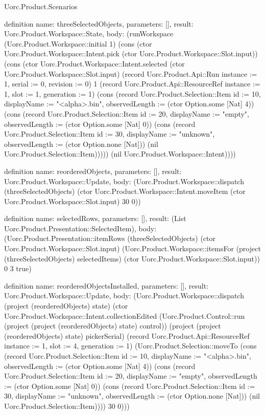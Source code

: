 \begin{lexlean}{Uorc.Product.Scenarios}
\begin{semanticmodule}
definition{
  name: threeSelectedObjects,
  parameters: [],
  result: Uorc.Product.Workspace::State,
  body: (runWorkspace (Uorc.Product.Workspace::initial 1) (cons (ctor Uorc.Product.Workspace::Intent.pick (ctor Uorc.Product.Workspace::Slot.input)) (cons (ctor Uorc.Product.Workspace::Intent.selected (ctor Uorc.Product.Workspace::Slot.input) (record Uorc.Product.Api::Run {instance := 1, serial := 0, revision := 0}) 1 (record Uorc.Product.Api::ResourceRef {instance := 1, slot := 1, generation := 1}) (cons (record Uorc.Product.Selection::Item {id := 10, displayName := "<alpha>.bin", observedLength := (ctor Option.some [Nat] 4)}) (cons (record Uorc.Product.Selection::Item {id := 20, displayName := "empty", observedLength := (ctor Option.some [Nat] 0)}) (cons (record Uorc.Product.Selection::Item {id := 30, displayName := "unknown", observedLength := (ctor Option.none [Nat])}) (nil Uorc.Product.Selection::Item))))) (nil Uorc.Product.Workspace::Intent))))
}

definition{
  name: reorderedObjects,
  parameters: [],
  result: Uorc.Product.Workspace::Update,
  body: (Uorc.Product.Workspace::dispatch (threeSelectedObjects) (ctor Uorc.Product.Workspace::Intent.moveItem (ctor Uorc.Product.Workspace::Slot.input) 30 0))
}

definition{
  name: selectedRows,
  parameters: [],
  result: (List Uorc.Product.Presentation::SelectedItem),
  body: (Uorc.Product.Presentation::itemRows (threeSelectedObjects) (ctor Uorc.Product.Workspace::Slot.input) (Uorc.Product.Workspace::itemsFor (project (threeSelectedObjects) selectedItems) (ctor Uorc.Product.Workspace::Slot.input)) 0 3 true)
}

definition{
  name: reorderedObjectsInstalled,
  parameters: [],
  result: Uorc.Product.Workspace::Update,
  body: (Uorc.Product.Workspace::dispatch (project (reorderedObjects) state) (ctor Uorc.Product.Workspace::Intent.collectionEdited (Uorc.Product.Control::run (project (project (reorderedObjects) state) control)) (project (project (reorderedObjects) state) pickerSerial) (record Uorc.Product.Api::ResourceRef {instance := 1, slot := 4, generation := 1}) (Uorc.Product.Selection::moveTo (cons (record Uorc.Product.Selection::Item {id := 10, displayName := "<alpha>.bin", observedLength := (ctor Option.some [Nat] 4)}) (cons (record Uorc.Product.Selection::Item {id := 20, displayName := "empty", observedLength := (ctor Option.some [Nat] 0)}) (cons (record Uorc.Product.Selection::Item {id := 30, displayName := "unknown", observedLength := (ctor Option.none [Nat])}) (nil Uorc.Product.Selection::Item)))) 30 0)))
}


\end{semanticmodule}
\end{lexlean}
